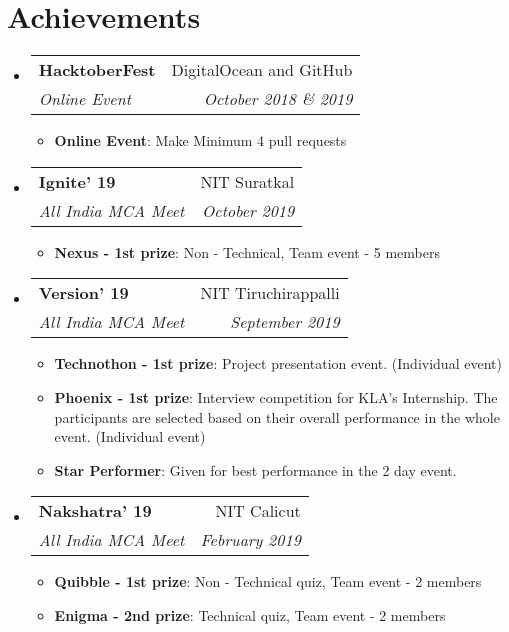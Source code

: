 \documentclass[letterpaper,11pt]{article}
\makeatletter
\newcommand{\resumeItem}[2]{
	\item\small{
    		\textbf{#1}{: #2 \vspace{-2pt}}
  	}
}
\newcommand{\resumeSubheading}[4]{
  	\vspace{-1pt}\item
    	\begin{tabular*}{0.97\textwidth}[t]{l@{\extracolsep{\fill}}r}
      		\textbf{#1} & #2 \\
      		\textit{\small#3} & \textit{\small #4} \\
    	\end{tabular*}\vspace{-5pt}
}
\newcommand{\resumeSubHeadingListStart}{\begin{itemize}[leftmargin=*]}
\newcommand{\resumeSubHeadingListEnd}{\end{itemize}}
\newcommand{\resumeItemListStart}{\begin{itemize}}
\newcommand{\resumeItemListEnd}{\end{itemize}\vspace{-5pt}}
\makeatother
\begin{document}
\section{Achievements}
  	\resumeSubHeadingListStart
		\resumeSubheading
      			{HacktoberFest}{DigitalOcean and GitHub}
      			{Online Event}{October 2018 \& 2019}
			\resumeItemListStart
      				\resumeItem{Online Event}
          				{Make Minimum 4 pull requests}
       			\resumeItemListEnd
		\resumeSubheading
      			{Ignite' 19}{NIT Suratkal}
      			{All India MCA Meet}{October 2019}
			\resumeItemListStart
      				\resumeItem{Nexus - 1st prize}
          				{Non - Technical, Team event - 5 members}
       			\resumeItemListEnd
		\resumeSubheading
      			{Version' 19}{NIT Tiruchirappalli}
      			{All India MCA Meet}{September 2019}
			\resumeItemListStart
      				\resumeItem{Technothon - 1st prize}
          				{Project presentation event. (Individual event)}
				\resumeItem{Phoenix - 1st prize}
          				{Interview competition for KLA's Internship. The participants are selected based on their overall performance in the whole event. (Individual event)}
				\resumeItem{Star Performer}
          				{Given for best performance in the 2 day event.}
       			\resumeItemListEnd
   		\resumeSubheading
      			{Nakshatra' 19}{NIT Calicut}
      			{All India MCA Meet}{February 2019}
			\resumeItemListStart
      				\resumeItem{Quibble - 1st prize}
          				{Non - Technical quiz, Team event - 2 members}
				\resumeItem{Enigma - 2nd prize}
          				{Technical quiz, Team event - 2 members}
       			\resumeItemListEnd
  	\resumeSubHeadingListEnd

\end{document}

